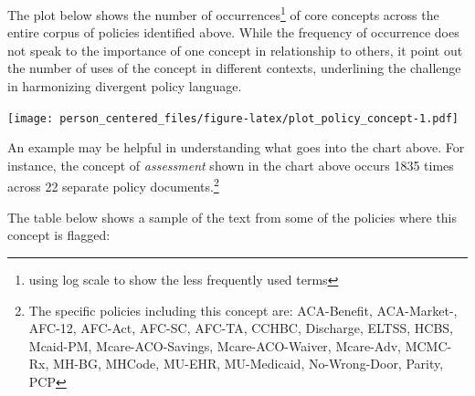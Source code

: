 \documentclass[
]{book}
\begin{document}
The plot below shows the number of occurrences\footnote{using log scale to show the less frequently used terms} of core concepts across the entire corpus of policies identified above. While the frequency of occurrence does not speak to the importance of one concept in relationship to others, it point out the number of uses of the concept in different contexts, underlining the challenge in harmonizing divergent policy language.

\texttt{[image: person\_centered\_files/figure-latex/plot\_policy\_concept-1.pdf]}

An example may be helpful in understanding what goes into the chart above. For instance, the concept of \emph{assessment} shown in the chart above occurs 1835 times across 22 separate policy documents.\footnote{The specific policies including this concept are: ACA-Benefit, ACA-Market-, AFC-12, AFC-Act, AFC-SC, AFC-TA, CCHBC, Discharge, ELTSS, HCBS, Mcaid-PM, Mcare-ACO-Savings, Mcare-ACO-Waiver, Mcare-Adv, MCMC-Rx, MH-BG, MHCode, MU-EHR, MU-Medicaid, No-Wrong-Door, Parity, PCP}

The table below shows a sample of the text from some of the policies where this concept is flagged:
\end{document}
